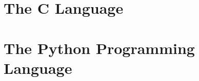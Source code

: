 \documentclass[english,12pt,a4paper]{article}
\begin{document}

\nocite{*}
\maketitle

\setcounter{page}{1}

\pagebreak

\setcounter{tocdepth}{2}
\tableofcontents

\pagebreak

\clearpage

\section{The C Language}


\section{The Python Programming Language}


\clearpage
\pagebreak
\listoffigures
\end{document}
